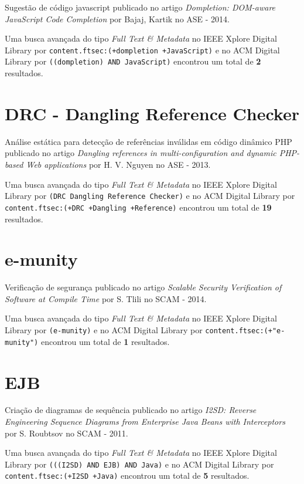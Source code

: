 Sugestão de código javascript
publicado no artigo
{\it Dompletion: DOM-aware JavaScript Code Completion}
por
Bajaj, Kartik
no
ASE
-
2014.


Uma busca avançada do tipo {\it Full Text \& Metadata} no IEEE Xplore Digital Library por
\texttt{content.ftsec:(+dompletion +JavaScript)}
e no ACM Digital Library por
\texttt{((dompletion) AND JavaScript)}
encontrou um total de
{\bf 2}
resultados.

\section{DRC - Dangling Reference Checker}

Análise estática para detecção de referências inválidas em código dinâmico PHP
publicado no artigo
{\it Dangling references in multi-configuration and dynamic PHP-based Web applications}
por
H. V. Nguyen
no
ASE
-
2013.


Uma busca avançada do tipo {\it Full Text \& Metadata} no IEEE Xplore Digital Library por
\texttt{(DRC Dangling Reference Checker)}
e no ACM Digital Library por
\texttt{content.ftsec:(+DRC +Dangling +Reference)}
encontrou um total de
{\bf 19}
resultados.

\section{e-munity}

Verificação de segurança
publicado no artigo
{\it Scalable Security Verification of Software at Compile Time}
por
S. Tlili
no
SCAM
-
2014.


Uma busca avançada do tipo {\it Full Text \& Metadata} no IEEE Xplore Digital Library por
\texttt{(e-munity)}
e no ACM Digital Library por
\texttt{content.ftsec:(+"e-munity")}
encontrou um total de
{\bf 1}
resultados.

\section{EJB}

Criação de diagramas de sequência
publicado no artigo
{\it I2SD: Reverse Engineering Sequence Diagrams from Enterprise Java Beans with Interceptors}
por
S. Roubtsov
no
SCAM
-
2011.


Uma busca avançada do tipo {\it Full Text \& Metadata} no IEEE Xplore Digital Library por
\texttt{(((I2SD) AND EJB) AND Java)}
e no ACM Digital Library por
\texttt{content.ftsec:(+I2SD +Java)}
encontrou um total de
{\bf 5}
resultados.


